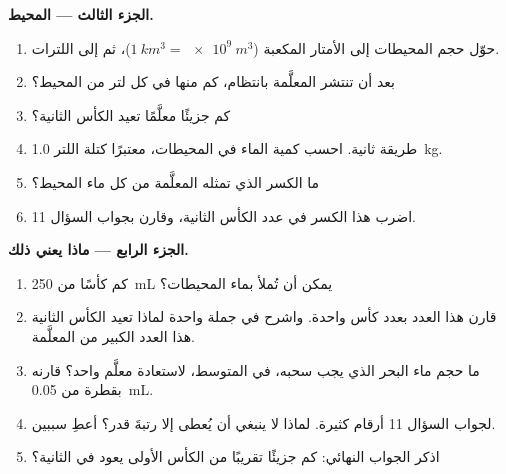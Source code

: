 \begin{problem}
\medskip
\noindent\textbf{الجزء الثالث --- المحيط.}
\begin{enumerate}[resume]
  \item حوّل حجم المحيطات إلى الأمتار المكعبة
        ($\qty{1}{km^3} = \qty{e9}{m^3}$)، ثم إلى اللترات.
  \item بعد أن تنتشر  المعلَّمة بانتظام، كم منها في كل لتر من
        المحيط؟
  \item كم جزيئًا معلَّمًا تعيد الكأس الثانية؟
  \item طريقة ثانية. احسب كمية الماء في المحيطات، معتبرًا كتلة اللتر
        \qty{1.0}{kg}.
  \item ما الكسر الذي تمثله  المعلَّمة من كل  ماء المحيط؟
  \item اضرب هذا الكسر في عدد  الكأس الثانية، وقارن
        بجواب السؤال 11.
\end{enumerate}

\medskip
\noindent\textbf{الجزء الرابع --- ماذا يعني ذلك.}
\begin{enumerate}[resume]
  \item كم كأسًا من \qty{250}{mL} يمكن أن تُملأ بماء
        المحيطات؟
  \item قارن هذا العدد بعدد  كأس واحدة. واشرح في جملة واحدة لماذا
        تعيد الكأس الثانية هذا العدد الكبير من 
        المعلَّمة.
  \item ما حجم ماء البحر الذي يجب سحبه، في المتوسط، لاستعادة  معلَّم
        واحد؟ قارنه بقطرة من
        \qty{0.05}{mL}.
  \item لجواب السؤال 11 أرقام كثيرة. لماذا لا ينبغي أن يُعطى إلا
        رتبةَ قدر؟ أعطِ سببين.
  \item اذكر الجواب النهائي: كم جزيئًا تقريبًا من الكأس الأولى يعود في
        الثانية؟
\end{enumerate}
\end{problem}
